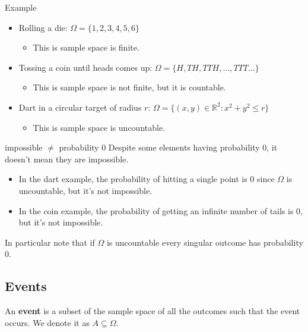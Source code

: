 \documentclass[10pt]{extarticle}
\newcommand{\R}{\mathbb{R}}
\begin{document}
\begin{examplebox}{Example}
    \begin{itemize}
        \item Rolling a die: $\Omega = \{1, 2, 3, 4, 5, 6\}$
              \begin{itemize}
                  \item This is sample space is finite.
              \end{itemize}
        \item Tossing a coin until heads comes up: $\Omega = \{H, TH, TTH, \dots, TTT\dots\}$
              \begin{itemize}
                  \item This is sample space is not finite, but it is countable.
              \end{itemize}
        \item Dart in a circular target of radius $r$: $\Omega = \{(x, y) \in \R^2 : x^2 + y^2 \le r\}$
              \begin{itemize}
                  \item This is sample space is uncountable.
              \end{itemize}
    \end{itemize}
\end{examplebox}

\begin{notebox}{impossible $\ne$ probability 0}
    Despite some elements having probability 0, it doesn't mean they are impossible.

    \begin{itemize}
        \item In the dart example, the probability of hitting a single point is 0 since $\Omega$ is uncountable, but it's not impossible.
        \item In the coin example, the probability of getting an infinite number of tails is 0, but it's not impossible.
    \end{itemize}

    In particular note that if $\Omega$ is uncountable every singular outcome has probability 0.
\end{notebox}

\subsection{Events}

An \textbf{event} is a subset of the sample space of all the outcomes such that the event occurs.
We denote it as $A \subseteq \Omega$.
\end{document}
